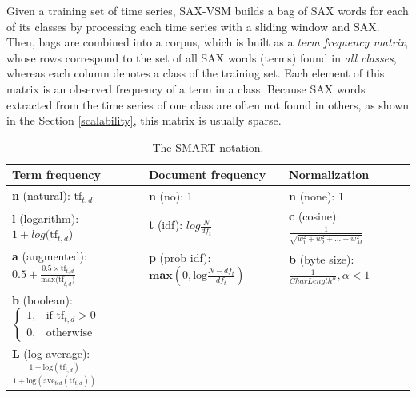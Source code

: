 Given a training set of time series, SAX-VSM builds a bag of SAX words for each of its classes by processing 
each time series with a sliding window and SAX. Then, bags are combined into a corpus, which is built as a 
\textit{term frequency matrix}, whose rows correspond to the set of all SAX words (terms) 
found in \textit{all classes}, whereas each column denotes a class of the training set. 
Each element of this matrix is an observed frequency of a term in a class. 
Because SAX words extracted from the time series of one class are often not 
found in others, as shown in the Section \ref{scalability}, this matrix is usually sparse. 

\begin{table}
\caption{The SMART notation. }
\vspace{0.4cm}
\label{tbl:smart}
{\footnotesize
\begin{tabularx}{\textwidth}{l l l}
\toprule[1pt]
\textbf{Term frequency} &\textbf{Document frequency} &\textbf{Normalization} \\[0.5ex]
\midrule
\textbf{n} (natural):  $\text{tf}_{t,d}$ & \textbf{n} (no): 1 & \textbf{n} (none): 1 \\[2ex]
\textbf{l} (logarithm): $1+log(\text{tf}_{t,d}$) & \textbf{t} (idf): $log\tfrac{N}{df_{t}}$ & \textbf{c} (cosine): $\tfrac{1}{\sqrt{w_1^2 + w_2^2 + ... + w_M^2}}$ \\[2ex]
\textbf{a} (augmented): $0.5 + \tfrac{0.5 \times \text{tf}_{t,d}}{\text{max(tf}_{t,d})}$ & \textbf{p} (prob idf): $\textbf{max}\left( 0,\text{log}\tfrac{N-df_{t}}{df_{t}} \right) $ & 
\textbf{b} (byte size): $\tfrac{1}{CharLength^\alpha}, \alpha < 1 $ \\[2ex]
\textbf{b} (boolean): $\begin{cases} 1, & \text{if tf}_{t,d} > 0 \\ 0, & \text{otherwise} \end{cases} $ & & \\[3ex]
\textbf{L} (log average): $ \tfrac{1+\text{log}(\text{tf}_{t,d})}{1+\text{log}(\text{ave}_{t \epsilon d}( \text{tf}_{t,d}))}$ & & \\[1ex]
\bottomrule[1pt]
\end{tabularx}
}
\end{table}

